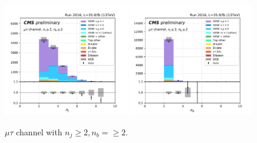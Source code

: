 \begin{figure}[ht]
    \includegraphics[width=0.49\textwidth]{chapters/Appendix/sectionPlots/figures/kinematics_pickles/mutau/2b/mutau_2b_nJets.pdf}
    \includegraphics[width=0.49\textwidth]{chapters/Appendix/sectionPlots/figures/kinematics_pickles/mutau/2b/mutau_2b_nBJets.pdf}
    
    \caption{$\mu\tau$ channel with $n_j\geq2, n_b=\geq2$.}
\end{figure}


